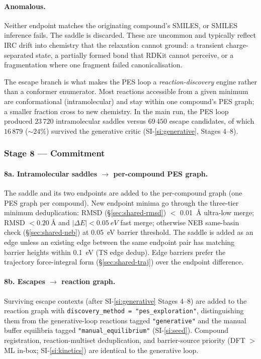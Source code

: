 \paragraph{Anomalous.}
Neither endpoint matches the originating compound's SMILES, or SMILES inference fails. The saddle is discarded. These are uncommon and typically reflect IRC drift into chemistry that the relaxation cannot ground: a transient charge-separated state, a partially formed bond that RDKit cannot perceive, or a fragmentation where one fragment failed canonicalisation.

The escape branch is what makes the PES loop a \emph{reaction-discovery} engine rather than a conformer enumerator. Most reactions accessible from a given minimum are conformational (intramolecular) and stay within one compound's PES graph; a smaller fraction cross to new chemistry. In the main run, the PES loop produced $23\,720$ intramolecular saddles versus $69\,450$ escape candidates, of which $16\,879$ ($\sim 24\%$) survived the generative critic (SI-\ref{si:generative}, Stages 4--8).


\subsubsection{Stage 8 --- Commitment}
\label{sec:pes-commit}

\paragraph{8a. Intramolecular saddles $\to$ per-compound PES graph.}
The saddle and its two endpoints are added to the per-compound graph (one PES graph per compound). New endpoint minima go through the three-tier minimum deduplication: RMSD (\S\ref{sec:shared-rmsd}) $<$ \SI{0.01}{\angstrom} ultra-low merge; RMSD $< \SI{0.20}{\angstrom}$ and $|\Delta E| < \SI{0.05}{eV}$ fast merge; otherwise NEB same-basin check (\S\ref{sec:shared-neb}) at \SI{0.05}{eV} barrier threshold. The saddle is added as an edge unless an existing edge between the same endpoint pair has matching barrier heights within \SI{0.1}{eV} (TS edge dedup). Edge barriers prefer the trajectory force-integral form (\S\ref{sec:shared-traj}) over the endpoint difference.

\paragraph{8b. Escapes $\to$ reaction graph.}
Surviving escape contexts (after SI-\ref{si:generative} Stages 4--8) are added to the reaction graph with \texttt{discovery\_method = "pes\_exploration"}, distinguishing them from the generative-loop reactions tagged \texttt{"generative"} and the manual buffer equilibria tagged \texttt{"manual\_equilibrium"} (SI-\ref{si:seed}). Compound registration, reaction-multiset deduplication, and barrier-source priority (DFT $>$ ML in-box; SI-\ref{si:kinetics}) are identical to the generative loop.


